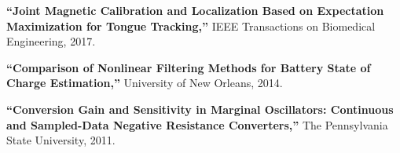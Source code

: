 \documentclass[11pt]{extarticle}
\begin{document}
\begin{description}[itemsep=-3pt,leftmargin=30.5pt,itemindent=-2em]
\item[] \textbf{``Joint Magnetic Calibration and Localization Based on Expectation Maximization for Tongue Tracking,''} IEEE Transactions on Biomedical Engineering, 2017.
\item[] \textbf{``Comparison of Nonlinear Filtering Methods for Battery State of Charge Estimation,''} University of New Orleans, 2014.
\item[] \textbf{``Conversion Gain and Sensitivity in Marginal Oscillators: Continuous and Sampled-Data Negative Resistance Converters,''} The Pennsylvania State University, 2011.
\end{description}
\vspace{-3pt}
\end{document}
